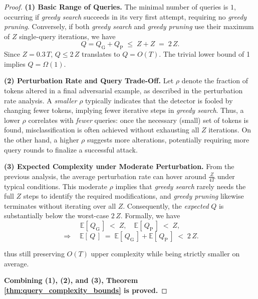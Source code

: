 \begin{proof}
\textbf{(1) Basic Range of Queries.}  
The minimal number of queries is \(1\), occurring if \emph{greedy search} succeeds in its very first attempt, requiring no \emph{greedy pruning}. Conversely, if both \emph{greedy search} and \emph{greedy pruning} use their maximum of \(Z\) single-query iterations, we have
\[
  Q = Q_{\mathrm{G}} + Q_{\mathrm{P}}
  \;\le\; Z + Z
  \;=\; 2\,Z.
\]
Since \(Z=0.3\,T\), \(Q\le 2\,Z\) translates to \(Q = O(T)\). The trivial lower bound of 1 implies \(Q=\Omega(1)\).

\noindent
\textbf{(2) Perturbation Rate and Query Trade-Off.}  
Let \(\rho\) denote the fraction of tokens altered in a final adversarial example, as described in the perturbation rate analysis. A \emph{smaller} \(\rho\) typically indicates that the detector is fooled by changing fewer tokens, implying fewer iterative steps in \emph{greedy search}. Thus, a lower \(\rho\) correlates with \emph{fewer} queries: once the necessary (small) set of tokens is found, misclassification is often achieved without exhausting all \(Z\) iterations. On the other hand, a higher \(\rho\) suggests more alterations, potentially requiring more query rounds to finalize a successful attack.

\noindent
\textbf{(3) Expected Complexity under Moderate Perturbation.}  
From the previous analysis, the average perturbation rate can hover around \(\tfrac{Z}{4T}\) under typical conditions. This moderate \(\rho\) implies that \emph{greedy search} rarely needs the full \(Z\) steps to identify the required modifications, and \emph{greedy pruning} likewise terminates without iterating over all \(Z\). Consequently, the \emph{expected} \(Q\) is substantially below the worst-case \(2\,Z\). Formally, we have
\[
  \mathbb{E}[\,Q_{\mathrm{G}}\,] \;<\; Z,
  \quad
  \mathbb{E}[\,Q_{\mathrm{P}}\,] \;<\; Z,
\]
\[
  \Longrightarrow\quad
  \mathbb{E}[\,Q\,] \;=\; \mathbb{E}[\,Q_{\mathrm{G}}\,] + \mathbb{E}[\,Q_{\mathrm{P}}\,]
  \;<\; 2\,Z.
\]

thus still preserving \(O(T)\) upper complexity while being strictly smaller on average. 

\noindent \textbf{Combining (1), (2), and (3), Theorem \ref{thm:query_complexity_bounds} is proved.}
\end{proof} 